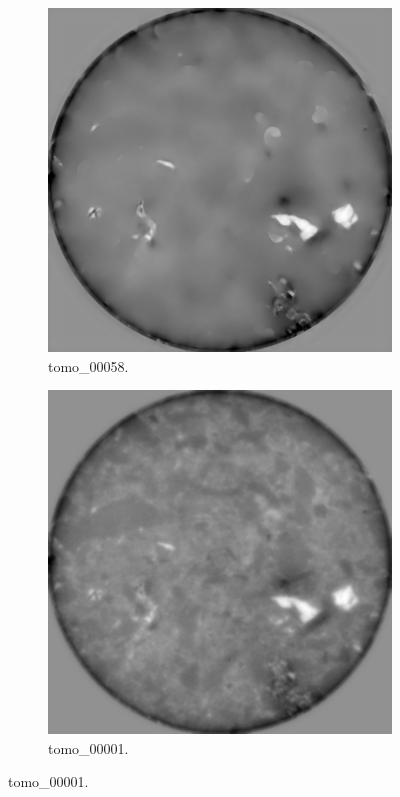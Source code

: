 \begin{figure}
  \begin{subfigure}[t]{.45\textwidth}
    \centering
    \includegraphics[width=\linewidth]{figures/shale/shale_dn_tomo00058/0.png}
    \caption{tomo\_00058. }
  \end{subfigure}
  \hfill
  \begin{subfigure}[t]{.45\textwidth}
    \centering
    \includegraphics[width=\linewidth]{figures/shale/shale_dn_tomo00001/0.png}
    \caption{tomo\_00001. }
  \end{subfigure}


\end{figure}
